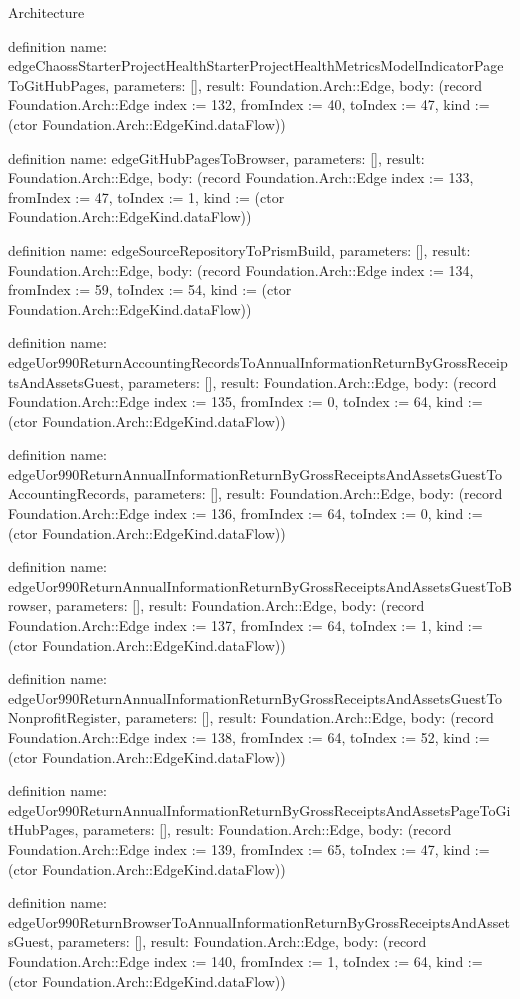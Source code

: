 \begin{lexlean}{Architecture}
\begin{semanticmodule}
definition{
  name: edgeChaossStarterProjectHealthStarterProjectHealthMetricsModelIndicatorPageToGitHubPages,
  parameters: [],
  result: Foundation.Arch::Edge,
  body: (record Foundation.Arch::Edge {index := 132, fromIndex := 40, toIndex := 47, kind := (ctor Foundation.Arch::EdgeKind.dataFlow)})
}

definition{
  name: edgeGitHubPagesToBrowser,
  parameters: [],
  result: Foundation.Arch::Edge,
  body: (record Foundation.Arch::Edge {index := 133, fromIndex := 47, toIndex := 1, kind := (ctor Foundation.Arch::EdgeKind.dataFlow)})
}

definition{
  name: edgeSourceRepositoryToPrismBuild,
  parameters: [],
  result: Foundation.Arch::Edge,
  body: (record Foundation.Arch::Edge {index := 134, fromIndex := 59, toIndex := 54, kind := (ctor Foundation.Arch::EdgeKind.dataFlow)})
}

definition{
  name: edgeUor990ReturnAccountingRecordsToAnnualInformationReturnByGrossReceiptsAndAssetsGuest,
  parameters: [],
  result: Foundation.Arch::Edge,
  body: (record Foundation.Arch::Edge {index := 135, fromIndex := 0, toIndex := 64, kind := (ctor Foundation.Arch::EdgeKind.dataFlow)})
}

definition{
  name: edgeUor990ReturnAnnualInformationReturnByGrossReceiptsAndAssetsGuestToAccountingRecords,
  parameters: [],
  result: Foundation.Arch::Edge,
  body: (record Foundation.Arch::Edge {index := 136, fromIndex := 64, toIndex := 0, kind := (ctor Foundation.Arch::EdgeKind.dataFlow)})
}

definition{
  name: edgeUor990ReturnAnnualInformationReturnByGrossReceiptsAndAssetsGuestToBrowser,
  parameters: [],
  result: Foundation.Arch::Edge,
  body: (record Foundation.Arch::Edge {index := 137, fromIndex := 64, toIndex := 1, kind := (ctor Foundation.Arch::EdgeKind.dataFlow)})
}

definition{
  name: edgeUor990ReturnAnnualInformationReturnByGrossReceiptsAndAssetsGuestToNonprofitRegister,
  parameters: [],
  result: Foundation.Arch::Edge,
  body: (record Foundation.Arch::Edge {index := 138, fromIndex := 64, toIndex := 52, kind := (ctor Foundation.Arch::EdgeKind.dataFlow)})
}

definition{
  name: edgeUor990ReturnAnnualInformationReturnByGrossReceiptsAndAssetsPageToGitHubPages,
  parameters: [],
  result: Foundation.Arch::Edge,
  body: (record Foundation.Arch::Edge {index := 139, fromIndex := 65, toIndex := 47, kind := (ctor Foundation.Arch::EdgeKind.dataFlow)})
}

definition{
  name: edgeUor990ReturnBrowserToAnnualInformationReturnByGrossReceiptsAndAssetsGuest,
  parameters: [],
  result: Foundation.Arch::Edge,
  body: (record Foundation.Arch::Edge {index := 140, fromIndex := 1, toIndex := 64, kind := (ctor Foundation.Arch::EdgeKind.dataFlow)})
}


\end{semanticmodule}
\end{lexlean}
